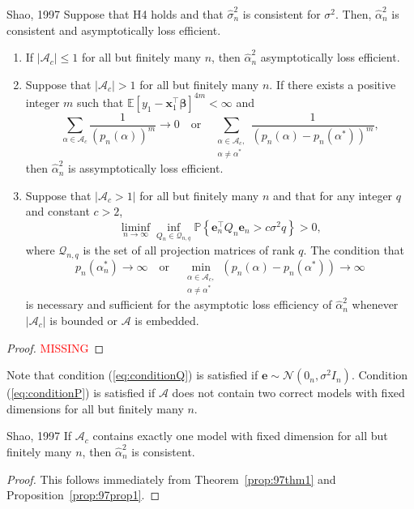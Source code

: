 \documentclass[12pt, letter paper]{article}
\newcommand{\1}{\mathmybb{1}}
\newcommand{\0}{\emptyset}
\newcommand{\prob}{\mathbb{P}}
\newcommand{\Ep}[1]{\mathbb{E}\left[ #1 \right]}
\newcommand{\paren}[1]{\left(#1 \right)}
\newcommand{\set}[1]{\left\{ #1 \right\}}
\newcommand{\Acal}{\mathcal{A}}
\newcommand{\Ncal}{\mathcal{N}}
\newcommand{\x}{\boldsymbol{x}}
\newcommand{\e}{\boldsymbol{e}}
\newcommand{\bbeta}{\boldsymbol{\beta}}
\newcommand{\alphahat}[1]{\hat{\alpha}^{#1}}
\newcommand{\sigmahat}{\hat{\sigma}^{2}_{n}}
\begin{document}
\begin{proposition}[Theorem]{{Shao, 1997}}
    Suppose that H4 holds and that \(\sigmahat\) is consistent for \(\sigma^{2}\). Then, \(\alphahat{2}_{n}\) is consistent and asymptotically loss efficient.
    \begin{enumerate}
        \item If \(|\Acal_{c}|\leq1\) for all but finitely many \(n\), then \(\alphahat{2}_{n}\) asymptotically loss efficient.
        \item Suppose that \(|\Acal_{c}|> 1\) for all but finitely many \(n\). If there exists a positive integer \(m\) such that \(\Ep{y_{1} - \x_{1}^{\top}\bbeta}^{4m}<\infty\) and 
        \begin{equation}
            \sum_{\alpha\in\Acal_{c}}\frac{1}{\paren{p_{n}(\alpha)}^{m}}\to 0 \quad\text{or}\quad \sum_{\substack{\alpha\in\Acal_{c},\\ \alpha\neq\alpha^{*}}}\frac{1}{\paren{p_{n}(\alpha) - p_{n}(\alpha^{*})}^{m}},
        \end{equation}
        then \(\alphahat{2}_{n}\) is assymptotically loss efficient.
        \item Suppose that \(|\Acal_{c}>1|\) for all but finitely many \(n\) and that for any integer \(q\) and constant \(c>2\), 
        \begin{equation}
            \label{eq:conditionQ}
            \liminf_{n\to\infty}\inf_{Q_{n}\in\mathcal{Q}_{n,q}}\prob\set{\e_{n}^{\top}Q_{n}\e_{n} > c\sigma^{2}q} > 0,
        \end{equation}
        where \(\mathcal{Q}_{n,q}\) is the set of all projection matrices of rank \(q\). The condition that
        \begin{equation}
            \label{eq:conditionP}
            p_{n}(\alpha^{*}_{n})\to\infty\quad\text{or}\quad \min_{\substack{\alpha\in\Acal_{c},\\ \alpha\neq\alpha^{*}}}\paren{p_{n}(\alpha) - p_{n}(\alpha^{*})}\to\infty
        \end{equation}
        is necessary and sufficient for the asymptotic loss efficiency of \(\alphahat{2}_{n}\) whenever \(|\Acal_{c}|\) is bounded or \(\Acal\) is embedded.
    \end{enumerate}
\end{proposition}

\begin{proof}
    \textcolor{red}{MISSING}
\end{proof}

Note that condition (\ref{eq:conditionQ}) is satisfied if \(\e\sim\Ncal(0_{n}, \sigma^{2}I_{n})\). Condition (\ref{eq:conditionP}) is satisfied if \(\Acal\) does not contain two correct models with fixed dimensions for all but finitely many \(n\).
\begin{proposition}[Corollary]{{Shao, 1997}}
    If \(\Acal_{c}\) contains exactly one model with fixed dimension for all but finitely many \(n\), then \(\alphahat{2}_{n}\) is consistent.
\end{proposition}
\begin{proof}
    This follows immediately from Theorem~\ref{prop:97thm1} and Proposition~\ref{prop:97prop1}.
\end{proof}


\pagebreak
  

\end{document}

